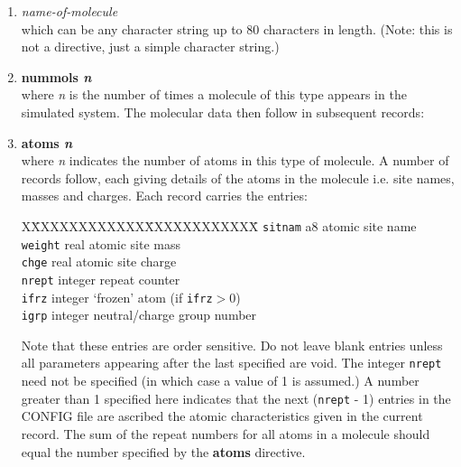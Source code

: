 \begin{enumerate}
\item {\em name-of-molecule}\\
which can be any character string up to 80 characters in length.
(Note: this is not a directive, just a simple character string.)
\item {\bf nummols {\em n}}\\
where {\em n} is the number of times a molecule of this type appears
in the simulated system. The molecular data then follow in subsequent
records:
\item {\bf atoms {\em n}}\\
where {\em n} indicates the number of atoms in this type of molecule.
A number of records follow, each giving details of the atoms in the
molecule i.e. site names, masses and charges. Each record carries the
entries: 
\begin{tabbing}
X\=XXXXXXXXXXXX\=XXXXXXXXXXXX\=\kill
\> {\tt sitnam} \> a8 \> atomic site name\\
\> {\tt weight} \> real \> atomic site mass\\
\> {\tt chge} \> real \> atomic site charge\\
\> {\tt nrept} \> integer \> repeat counter\\
\> {\tt ifrz} \> integer \> `frozen' atom (if {\tt ifrz}$>0$)\\
\> {\tt igrp} \> integer \> neutral/charge group number\\
\end{tabbing}
Note that these entries are order sensitive. Do not leave blank
entries unless all parameters appearing after the last specified are void.
The integer {\tt nrept} need not be specified (in which case a value
of 1 is assumed.) A number greater than 1 specified here indicates
that the next ({\tt nrept} - 1) entries in the CONFIG file are
ascribed the atomic characteristics given in the current record.
The sum of the repeat numbers for all atoms in a molecule should equal
the number specified by the {\bf atoms} directive.


\end{enumerate}
